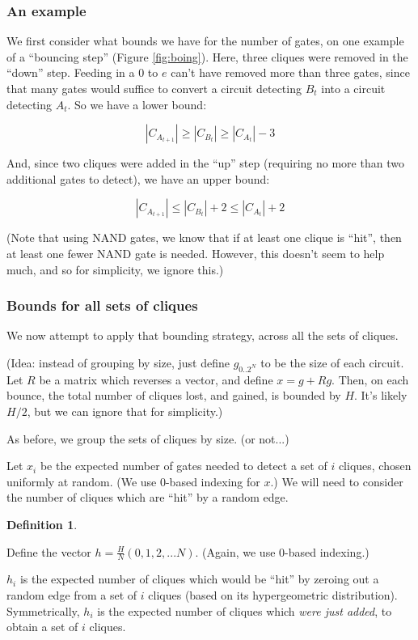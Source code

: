 \documentclass[12pt]{article}
\theoremstyle{definition}
\newtheorem{defn}{Definition}[section]
\begin{document}
\subsubsection{An example}

We first consider what bounds we have for the number of gates,
on one example of a ``bouncing step'' (Figure \ref{fig:boing}).
Here, three cliques were removed in the ``down'' step. Feeding in a 0
to $e$ can't have removed more than three gates, since that many gates would suffice
to convert a circuit detecting $B_t$ into a circuit detecting $A_t$.
So we have a lower bound:

\[
|C_{A_{t+1}}| \ge |C_{B_t}| \ge |C_{A_t}| - 3
\]

And, since two cliques were added in the ``up'' step (requiring no more than two
additional gates to detect), we have an upper bound:

\[
|C_{A_{t+1}}| \le |C_{B_t}| + 2 \le |C_{A_t}| + 2
\]

(Note that using NAND gates, we know that if at least one clique is ``hit'', then
at least one fewer NAND gate is needed. However, this doesn't seem to help much,
and so for simplicity, we ignore this.)

\subsubsection{Bounds for all sets of cliques}

We now attempt to apply that bounding strategy, across all the sets of cliques.

(Idea: instead of grouping by size, just define $g_{0..2^N}$ to be the size of each circuit.
Let $R$ be a matrix which reverses a vector, and define $x = g + Rg$. Then,
on each bounce, the total number of cliques lost, and gained, is bounded by $H$.
It's likely $H/2$, but we can ignore that for simplicity.)

As before, we group the sets of cliques by size. (or not...)

Let $x_i$ be the expected number of gates needed to detect a set
of $i$ cliques, chosen uniformly at random. (We use 0-based indexing
for $x$.) We will need to consider the number of cliques which are ``hit''
by a random edge.

\begin{defn} \label{defn:sequenceVector}

Define the vector $h = \frac{H}{N}(0, 1, 2, ... N)$. (Again, we use 0-based indexing.)

$h_i$ is the expected number of cliques which would be ``hit'' by zeroing out a random edge
from a set of $i$ cliques (based on its hypergeometric distribution).
Symmetrically, $h_i$ is the expected number of cliques which {\em were just added}, to obtain a
set of $i$ cliques.

\end{defn}
\end{document}
